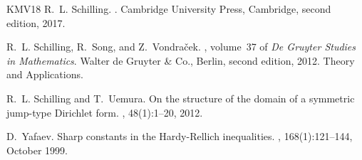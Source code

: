 \documentclass[12pt,reqno]{amsart}
\theoremstyle{definition}
\theoremstyle{remark}
\numberwithin{equation}{section}
\newcommand{\1}{\mathbbm{1}}
\begin{document}
\begin{thebibliography}{KMV{\etalchar{+}}18}
R.~L. Schilling.
.
\newblock Cambridge University Press, Cambridge, second edition, 2017.

R.~L. Schilling, R.~Song, and Z.~Vondra\v{c}ek.
, volume~37 of {\em De Gruyter Studies in
  Mathematics}.
\newblock Walter de Gruyter \& Co., Berlin, second edition, 2012.
\newblock Theory and Applications.

R.~L. Schilling and T.~Uemura.
\newblock On the structure of the domain of a symmetric jump-type {D}irichlet
  form.
, 48(1):1--20, 2012.

D.~Yafaev.
\newblock Sharp constants in the {H}ardy-{R}ellich inequalities.
, 168(1):121--144, October 1999.

\end{thebibliography}
\end{document}
